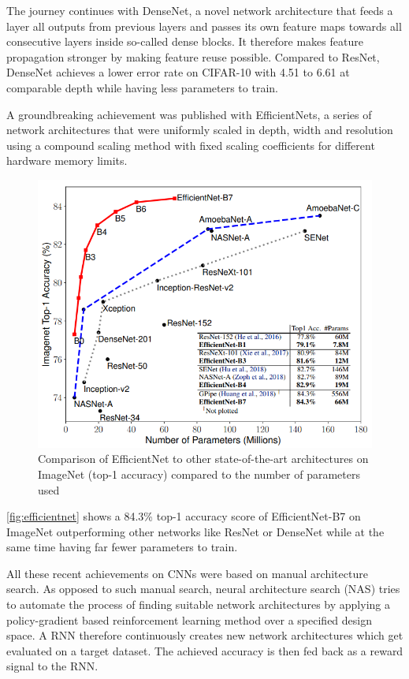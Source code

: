 The journey continues with DenseNet, a novel network architecture that feeds a layer all outputs from previous layers and passes its own feature maps towards all consecutive layers inside so-called dense blocks. It therefore makes feature propagation stronger by making feature reuse possible. Compared to ResNet, DenseNet achieves a lower error rate on CIFAR-10 with 4.51 to 6.61 at comparable depth while having less parameters to train. \cite{GaoHuang.2016}

A groundbreaking achievement was published with EfficientNets, a series of network architectures that were uniformly scaled in depth, width and resolution using a compound scaling method with fixed scaling coefficients for different hardware memory limits. 

\begin{figure}[t]
	\begin{center}
		\includegraphics[width=0.8\linewidth]{images/efficientnet.PNG}
	\end{center}
	\caption{Comparison of EfficientNet to other state-of-the-art architectures on ImageNet (top-1 accuracy) compared to the number of parameters used}
	\label{fig:efficientnet}
\end{figure}

\autoref{fig:efficientnet} shows a 84.3\% top-1 accuracy score of EfficientNet-B7 on ImageNet outperforming other networks like ResNet or DenseNet while at the same time having far fewer parameters to train. \cite{LeMingxingTan.2019}

All these recent achievements on CNNs were based on manual architecture search. As opposed to such manual search, neural architecture search (NAS) tries to automate the process of finding suitable network architectures by applying a policy-gradient based reinforcement learning method over a specified design space. A RNN therefore continuously creates new network architectures which get evaluated on a target dataset. The achieved accuracy is then fed back as a reward signal to the RNN. \cite{LeBarretZoph.2017}

